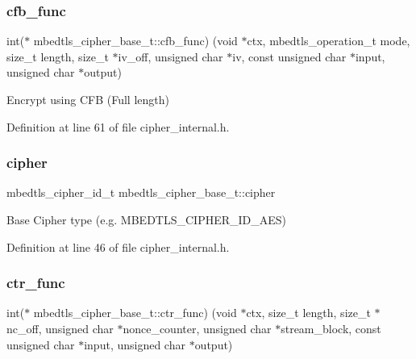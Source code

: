 \subsubsection{\texorpdfstring{cfb\+\_\+func}{cfb\_func}}
{\footnotesize\ttfamily int($\ast$ mbedtls\+\_\+cipher\+\_\+base\+\_\+t\+::cfb\+\_\+func) (void $\ast$ctx, mbedtls\+\_\+operation\+\_\+t mode, size\+\_\+t length, size\+\_\+t $\ast$iv\+\_\+off, unsigned char $\ast$iv, const unsigned char $\ast$input, unsigned char $\ast$output)}

Encrypt using C\+FB (Full length) 

Definition at line 61 of file cipher\+\_\+internal.\+h.

\mbox{\label{structmbedtls__cipher__base__t_a0c4c819c23b0a579445f92a4bee7d577}} 
\subsubsection{\texorpdfstring{cipher}{cipher}}
{\footnotesize\ttfamily mbedtls\+\_\+cipher\+\_\+id\+\_\+t mbedtls\+\_\+cipher\+\_\+base\+\_\+t\+::cipher}

Base Cipher type (e.\+g. M\+B\+E\+D\+T\+L\+S\+\_\+\+C\+I\+P\+H\+E\+R\+\_\+\+I\+D\+\_\+\+A\+ES) 

Definition at line 46 of file cipher\+\_\+internal.\+h.

\mbox{\label{structmbedtls__cipher__base__t_ac3d68fe4b133c56acb5b05029b8f60ea}} 
\subsubsection{\texorpdfstring{ctr\+\_\+func}{ctr\_func}}
{\footnotesize\ttfamily int($\ast$ mbedtls\+\_\+cipher\+\_\+base\+\_\+t\+::ctr\+\_\+func) (void $\ast$ctx, size\+\_\+t length, size\+\_\+t $\ast$nc\+\_\+off, unsigned char $\ast$nonce\+\_\+counter, unsigned char $\ast$stream\+\_\+block, const unsigned char $\ast$input, unsigned char $\ast$output)}


